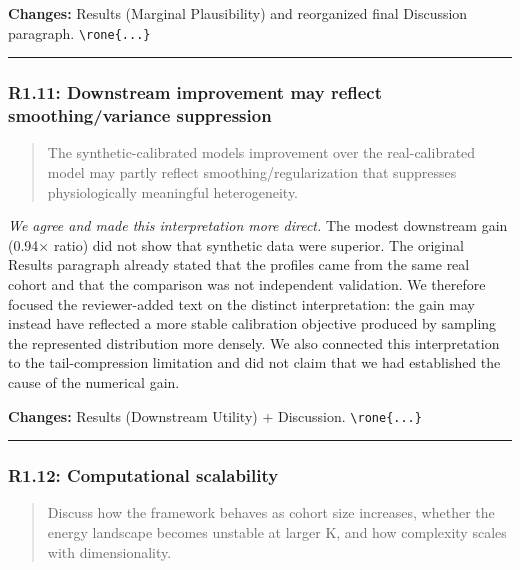 \documentclass[
  11pt,
  letterpaper,
]{article}
\begin{document}
\textbf{Changes:} Results (Marginal Plausibility) and reorganized final Discussion paragraph. \texttt{\textbackslash{}rone\{...\}}

\begin{center}\rule{0.5\linewidth}{0.5pt}\end{center}

\subsubsection{R1.11: Downstream improvement may reflect smoothing/variance suppression}\label{r111-downstream-improvement-may-reflect-smoothingvariance-suppression}

\begin{quote}
The synthetic-calibrated model\textquotesingle s improvement over the real-calibrated model may partly reflect smoothing/regularization that suppresses physiologically meaningful heterogeneity.
\end{quote}

\emph{We agree and made this interpretation more direct.} The modest downstream gain (0.94× ratio) did not show that synthetic data were superior. The original Results paragraph already stated that the profiles came from the same real cohort and that the comparison was not independent validation. We therefore focused the reviewer-added text on the distinct interpretation: the gain may instead have reflected a more stable calibration objective produced by sampling the represented distribution more densely. We also connected this interpretation to the tail-compression limitation and did not claim that we had established the cause of the numerical gain.

\textbf{Changes:} Results (Downstream Utility) + Discussion. \texttt{\textbackslash{}rone\{...\}}

\begin{center}\rule{0.5\linewidth}{0.5pt}\end{center}

\subsubsection{R1.12: Computational scalability}\label{r112-computational-scalability}

\begin{quote}
Discuss how the framework behaves as cohort size increases, whether the energy landscape becomes unstable at larger K, and how complexity scales with dimensionality.
\end{quote}
\end{document}
